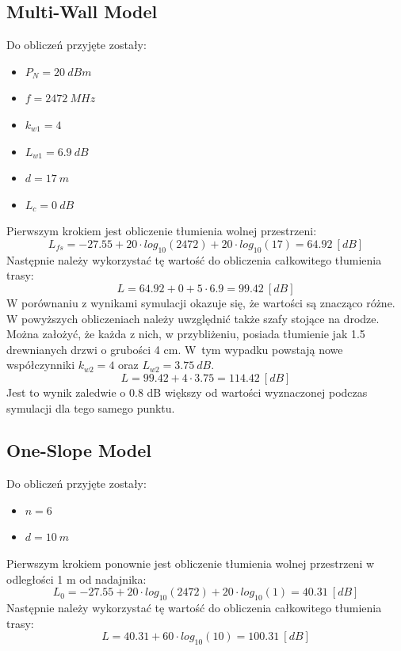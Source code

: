 \documentclass[12pt, a4paper, oneside]{article}
\begin{document}
\subsection{Multi-Wall Model}
\indent\indent Do obliczeń przyjęte zostały:
\begin{itemize}
\item $P_N=20~dBm$
\item $f=2472~MHz$
\item $k_{w1}=4$
\item $L_{w1}=6.9~dB$
\item $d=17~m$
\item $L_c=0~dB$
\end{itemize}
\indent\indent Pierwszym krokiem jest obliczenie tłumienia wolnej przestrzeni:
\begin{equation}
L_{fs}=-27.55+20\cdot log_{10}(2472)+20\cdot log_{10}(17)=64.92~[dB]
\end{equation}
\indent Następnie należy wykorzystać tę wartość do obliczenia całkowitego tłumienia trasy:
\begin{equation}
L=64.92+0+5\cdot6.9=99.42~[dB]
\end{equation}
\indent W porównaniu z wynikami symulacji okazuje się, że wartości są znacząco różne. W powyższych obliczeniach należy uwzględnić także szafy stojące na drodze. Można założyć, że każda z nich, w przybliżeniu, posiada tłumienie jak 1.5 drewnianych drzwi o grubości 4 cm. W~tym wypadku powstają nowe współczynniki $k_{w2}=4$ oraz $L_{w2}=3.75~dB$.
\begin{equation}
L=99.42+4\cdot 3.75 = 114.42~[dB]
\end{equation}
\indent\indent Jest to wynik zaledwie o 0.8 dB większy od wartości wyznaczonej podczas symulacji dla tego samego punktu.
\subsection{One-Slope Model}
\indent\indent Do obliczeń przyjęte zostały:
\begin{itemize}
\item $n=6$
\item $d=10~m$
\end{itemize}
\indent\indent Pierwszym krokiem ponownie jest obliczenie tłumienia wolnej przestrzeni w odległości 1 m od nadajnika:
\begin{equation}
L_0=-27.55+20\cdot log_{10}(2472)+20\cdot log_{10}(1)=40.31~[dB]
\end{equation}
\indent Następnie należy wykorzystać tę wartość do obliczenia całkowitego tłumienia trasy:
\begin{equation}
L=40.31+60\cdot log_{10}(10)=100.31~[dB]
\end{equation}
\end{document}
